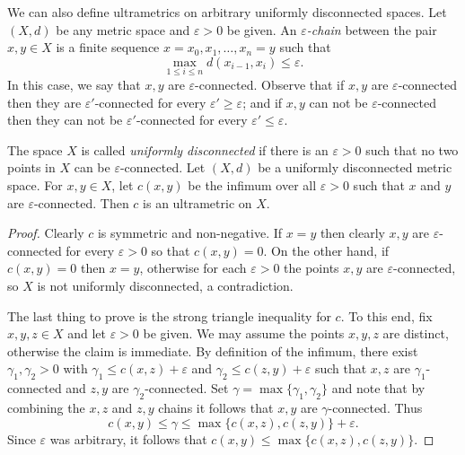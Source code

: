 We can also define ultrametrics on arbitrary uniformly disconnected spaces.
Let \( (X,d) \) be any metric space and \( \varepsilon > 0 \) be given. An \emph{\( \varepsilon  \)-chain} between the pair \( x,y \in X \) is a finite sequence \( x = x_0 , x_1, \hdots , x_{n} = y  \) such that \[\max_{1 \leq i \leq n}  d(x_{i-1} , x_{i}) \leq \varepsilon. \] In this case, we say that \( x, y \) are \( \varepsilon  \)-connected. Observe that if \( x, y \) are \( \varepsilon  \)-connected then they are \( \varepsilon ' \)-connected for every \( \varepsilon ' \geq \varepsilon  \); and if \( x, y \) can not be \( \varepsilon  \)-connected then they can not be \( \varepsilon ' \)-connected for every \( \varepsilon ' \leq \varepsilon  \).


The space \( X \) is called \emph{uniformly disconnected} if there is an \( \varepsilon > 0 \) such that no two points in \( X \) can be \( \varepsilon  \)-connected.
Let \( (X,d) \) be a uniformly disconnected metric space. For \( x,y \in X \), let \( c(x,y) \) be the infimum over all \( \varepsilon > 0 \) such that \( x \) and \( y \) are \( \varepsilon  \)-connected. Then \( c \) is an ultrametric on \( X \).
\begin{proof}
Clearly \( c \) is symmetric and non-negative. If \( x = y \) then clearly \( x,y \) are \( \varepsilon  \)-connected for every \( \varepsilon > 0 \) so that \( c(x,y) = 0 \). On the other hand, if \( c(x,y) = 0  \) then \( x = y \), otherwise for each \( \varepsilon > 0 \) the points \( x,y \) are \( \varepsilon  \)-connected, so \( X \) is not uniformly disconnected, a contradiction.

The last thing to prove is the strong triangle inequality for \( c \). To this end, fix \( x,y,z \in X \) and let \( \varepsilon > 0 \) be given. We may assume the points \( x,y,z \) are distinct, otherwise the claim is immediate. By definition of the infimum, there exist \( \gamma_1, \gamma_2 > 0 \) with \( \gamma_1 \leq c(x,z) + \varepsilon  \) and \( \gamma_2 \leq c(z,y) + \varepsilon  \) such that \( x,z \) are \( \gamma_1 \)-connected and \( z,y \) are \( \gamma_2 \)-connected. Set \( \gamma = \max \{ \gamma_1, \gamma_2 \}\) and note that by combining the \( x,z \) and \( z,y \) chains it follows that \( x,y \) are \( \gamma \)-connected. Thus \[ c(x,y) \leq \gamma \leq \max \{ c(x,z), c(z,y) \} + \varepsilon . \] Since \( \varepsilon  \) was arbitrary, it follows that \( c(x,y) \leq \max \{ c(x,z), c(z,y) \} \).
\end{proof}
